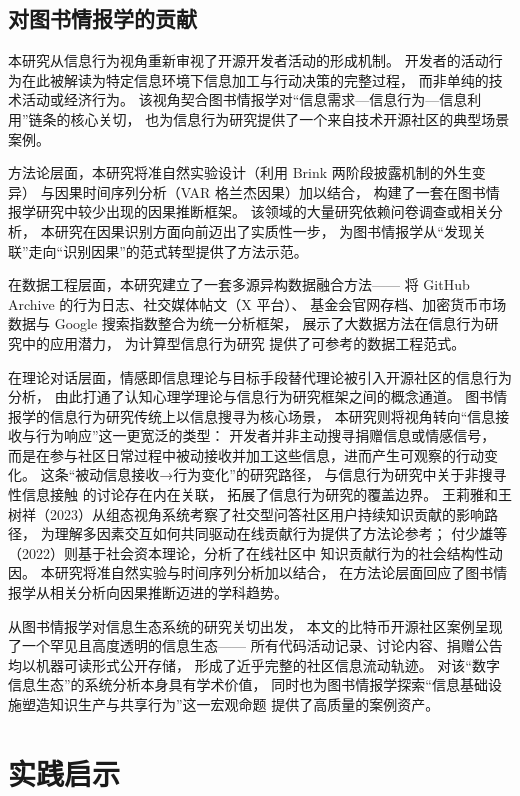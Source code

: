 \subsection{对图书情报学的贡献}

本研究从信息行为视角重新审视了开源开发者活动的形成机制。
开发者的活动行为在此被解读为特定信息环境下信息加工与行动决策的完整过程，
而非单纯的技术活动或经济行为。
该视角契合图书情报学对“信息需求—信息行为—信息利用”链条的核心关切，
也为信息行为研究提供了一个来自技术开源社区的典型场景案例。

方法论层面，本研究将准自然实验设计（利用 Brink 两阶段披露机制的外生变异）
与因果时间序列分析（VAR 格兰杰因果）加以结合，
构建了一套在图书情报学研究中较少出现的因果推断框架。
该领域的大量研究依赖问卷调查或相关分析，
本研究在因果识别方面向前迈出了实质性一步，
为图书情报学从“发现关联”走向“识别因果”的范式转型提供了方法示范。

在数据工程层面，本研究建立了一套多源异构数据融合方法——
将 GitHub Archive 的行为日志、社交媒体帖文（X 平台）、
基金会官网存档、加密货币市场数据与 Google 搜索指数整合为统一分析框架，
展示了大数据方法在信息行为研究中的应用潜力，
为计算型信息行为研究
提供了可参考的数据工程范式。

在理论对话层面，情感即信息理论与目标手段替代理论被引入开源社区的信息行为分析，
由此打通了认知心理学理论与信息行为研究框架之间的概念通道。
图书情报学的信息行为研究传统上以信息搜寻为核心场景，
本研究则将视角转向“信息接收与行为响应”这一更宽泛的类型：
开发者并非主动搜寻捐赠信息或情感信号，
而是在参与社区日常过程中被动接收并加工这些信息，进而产生可观察的行动变化。
这条“被动信息接收→行为变化”的研究路径，
与信息行为研究中关于非搜寻性信息接触
的讨论存在内在关联\cite{sun2017motivation}，
拓展了信息行为研究的覆盖边界。
王莉雅和王树祥（2023）从组态视角系统考察了社交型问答社区用户持续知识贡献的影响路径，
为理解多因素交互如何共同驱动在线贡献行为提供了方法论参考\cite{wang2023config}；
付少雄等（2022）则基于社会资本理论，分析了在线社区中
知识贡献行为的社会结构性动因\cite{fu2022social}。
本研究将准自然实验与时间序列分析加以结合，
在方法论层面回应了图书情报学从相关分析向因果推断迈进的学科趋势。

从图书情报学对信息生态系统的研究关切出发，
本文的比特币开源社区案例呈现了一个罕见且高度透明的信息生态——
所有代码活动记录、讨论内容、捐赠公告均以机器可读形式公开存储，
形成了近乎完整的社区信息流动轨迹。
对该“数字信息生态”的系统分析本身具有学术价值，
同时也为图书情报学探索“信息基础设施塑造知识生产与共享行为”这一宏观命题
提供了高质量的案例资产\cite{alami2024sustainability}。


\section{实践启示}

